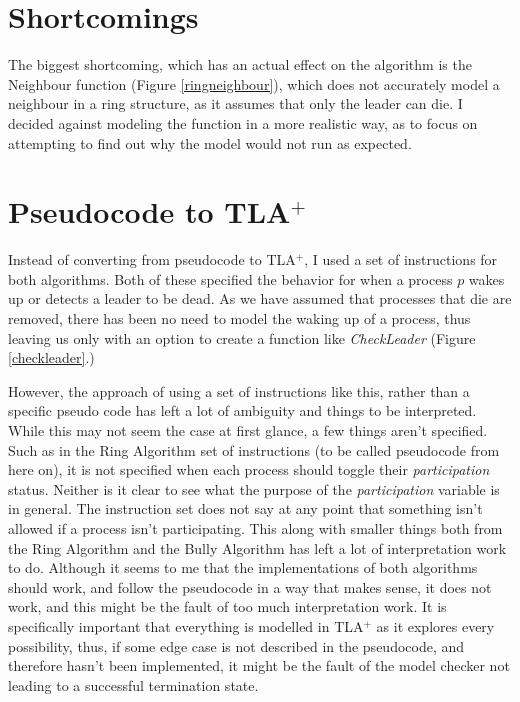 \documentclass{report}
\begin{document}
\section{Shortcomings}
The biggest shortcoming, which has an actual effect on the algorithm is the Neighbour function (Figure \ref{ringneighbour}), which does not accurately model a neighbour in a ring structure, as it assumes that only the leader can die. I decided against modeling the function in a more realistic way, as to focus on attempting to find out why the model would not run as expected.


\section{Pseudocode to TLA$^{+}$}

Instead of converting from pseudocode to TLA$^{+}$, I used a set of instructions for both algorithms. Both of these specified the behavior for when a process $p$ wakes up or detects a leader to be dead. As we have assumed that processes that die are removed, there has been no need to model the waking up of a process, thus leaving us only with an option to create a function like \textit{CheckLeader} (Figure \ref{checkleader}.)

However, the approach of using a set of instructions like this, rather than a specific pseudo code has left a lot of ambiguity and things to be interpreted. While this may not seem the case at first glance, a few things aren't specified. Such as in the Ring Algorithm set of instructions (to be called pseudocode from here on), it is not specified when each process should toggle their \textit{participation} status. Neither is it clear to see what the purpose of the \textit{participation} variable is in general. The instruction set does not say at any point that something isn't allowed if a process isn't participating. This along with smaller things both from the Ring Algorithm and the Bully Algorithm has left a lot of interpretation work to do. Although it seems to me that the implementations of both algorithms should work, and follow the pseudocode in a way that makes sense, it does not work, and this might be the fault of too much interpretation work. It is specifically important that everything is modelled in TLA$^{+}$ as it explores every possibility, thus, if some edge case is not described in the pseudocode, and therefore hasn't been implemented, it might be the fault of the model checker not leading to a successful termination state.
\end{document}
